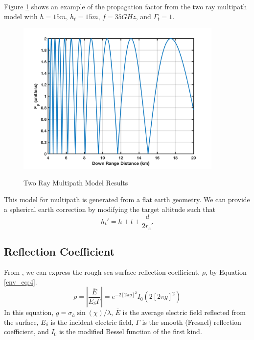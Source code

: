 Figure \ref{env_fig:3t} shows an example of the propagation factor from the two ray multipath model with $h = 15m$, $h_t = 15m$, $f = 35GHz$, and $\Gamma_t = 1$. 
\begin{figure}[H]
  \begin{center}
\includegraphics[width=4in]{../media/multistatic/two_ray_multipath_results.png}
  \end{center}
  \renewcommand{\baselinestretch}{1} \small\normalsize
  \begin{quote}
    \caption[Two Ray Multipath Model Results]{Two Ray Multipath Model Results\label{env_fig:3t}}
  \end{quote}
\end{figure}
\renewcommand{\baselinestretch}{2} \small\normalsize

This model for multipath is generated from a flat earth geometry. We can provide a spherical earth correction by modifying the target altitude \cite{blake_radar} such that
\begin{equation}
  \label{env_eq:3r}
h_t' = h+t + \frac{d}{2r_e'}
\end{equation}

\subsection{Reflection Coefficient}
From \cite{miller_reflection}, we can express the rough sea surface reflection coefficient, $\rho$, by Equation \ref{env_eq:4}. 
  \begin{equation}
  \label{env_eq:4}
\rho = \left|\frac{\bar{E}}{E_\delta \Gamma} \right| = e^{-2\left[2\pi g \right]^2}I_0\left( 2\left[2\pi g \right]^2\right) 
\end{equation}
In this equation, $g = \sigma_h\sin(\chi)/\lambda$, $\bar{E}$ is the average electric field reflected from the surface, $E_\delta$ is the incident electric field, $\Gamma$ is the smooth (Fresnel) reflection coefficient, and $I_0$ is the modified Bessel function of the first kind.


